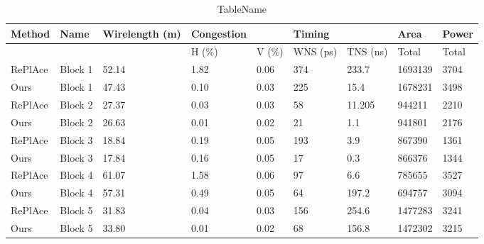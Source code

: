 ﻿\begin{table}
\centering
\caption{TableName}
\begin{tabular}{|l|l|l|l|l|l|l|l|l|}
\hline

Method & Name & Wirelength (m) & Congestion &  & Timing &  & Area & Power \\ \hline
 &  &  & H (\%) & V (\%) & WNS (ps) & TNS (ns) & Total & Total \\ \hline
RePlAce & Block 1 & 52.14 & 1.82 & 0.06 & 374 & 233.7 & 1693139 & 3704 \\ \hline
Ours & Block 1 & 47.43 & 0.10 & 0.03 & 225 & 15.4 & 1678231 & 3498 \\ \hline
RePlAce & Block 2 & 27.37 & 0.03 & 0.03 & 58 & 11.205 & 944211 & 2210 \\ \hline
Ours & Block 2 & 26.63 & 0.01 & 0.02 & 21 & 1.1 & 941801 & 2176 \\ \hline
RePlAce & Block 3 & 18.84 & 0.19 & 0.05 & 193 & 3.9 & 867390 & 1361 \\ \hline
Ours & Block 3 & 17.84 & 0.16 & 0.05 & 17 & 0.3 & 866376 & 1344 \\ \hline
RePlAce & Block 4 & 61.07 & 1.58 & 0.06 & 97 & 6.6 & 785655 & 3527 \\ \hline
Ours & Block 4 & 57.31 & 0.49 & 0.05 & 64 & 197.2 & 694757 & 3094 \\ \hline
RePlAce & Block 5 & 31.83 & 0.04 & 0.03 & 156 & 254.6 & 1477283 & 3241 \\ \hline
Ours & Block 5 & 33.80 & 0.01 & 0.02 & 68 & 156.8 & 1472302 & 3215 \\ \hline

\end{tabular}
\end{table}